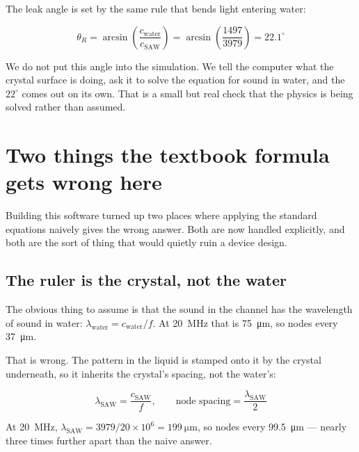 \documentclass[11pt,a4paper]{article}
\begin{document}
The leak angle is set by the same rule that bends light entering water:

\begin{equation}
\theta_R = \arcsin\!\left(\frac{c_{\text{water}}}{c_{\text{SAW}}}\right)
= \arcsin\!\left(\frac{1497}{3979}\right) = 22.1^\circ
\end{equation}

We do not put this angle into the simulation. We tell the computer what the
crystal surface is doing, ask it to solve the equation for sound in water, and
the $22^\circ$ comes out on its own. That is a small but real check that the
physics is being solved rather than assumed.

\clearpage
\section{Two things the textbook formula gets wrong here}

Building this software turned up two places where applying the standard
equations naively gives the wrong answer. Both are now handled explicitly, and
both are the sort of thing that would quietly ruin a device design.

\subsection{The ruler is the crystal, not the water}
\label{sec:ruler}

The obvious thing to assume is that the sound in the channel has the wavelength
of sound in water: $\lambda_{\text{water}} = c_{\text{water}}/f$. At
\SI{20}{\mega\hertz} that is \SI{75}{\micro\meter}, so nodes every
\SI{37}{\micro\meter}.

That is wrong. The pattern in the liquid is stamped onto it by the crystal
underneath, so it inherits the crystal's spacing, not the water's:

\begin{equation}
\lambda_{\text{SAW}} = \frac{c_{\text{SAW}}}{f},
\qquad
\text{node spacing} = \frac{\lambda_{\text{SAW}}}{2}
\end{equation}

At \SI{20}{\mega\hertz}, $\lambda_{\text{SAW}} = 3979/20\times10^{6} =
\SI{199}{\micro\meter}$, so nodes every \SI{99.5}{\micro\meter} --- nearly three
times further apart than the naive answer.
\end{document}
